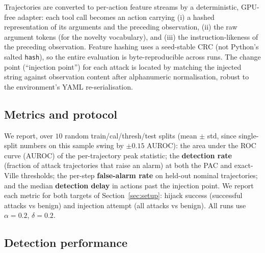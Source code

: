 \documentclass[10pt,journal,compsoc]{IEEEtran}
\theoremstyle{plain}
\theoremstyle{definition}
\begin{document}
Trajectories are converted to per-action feature streams by a deterministic,
GPU-free adapter: each tool call becomes an action carrying (i) a hashed
representation of its arguments and the preceding observation, (ii) the raw
argument tokens (for the novelty vocabulary), and (iii) the
instruction-likeness of the preceding observation. Feature hashing uses a
seed-stable CRC (not Python's salted \texttt{hash}), so the entire evaluation
is byte-reproducible across runs. The change point (``injection point'') for
each attack is located by matching the injected string against observation
content after alphanumeric normalisation, robust to the environment's YAML
re-serialisation.

\subsection{Metrics and protocol}

We report, over \(10\) random train/cal/thresh/test splits (mean \(\pm\)
std, since single-split numbers on this sample swing by \(\pm 0.15\) AUROC):
the area under the ROC curve (AUROC) of the per-trajectory peak statistic;
the \textbf{detection rate} (fraction of attack trajectories that raise an
alarm) at both the PAC and exact-Ville thresholds; the per-step
\textbf{false-alarm rate} on held-out nominal trajectories; and the median
\textbf{detection delay} in actions past the injection point. We report each
metric for both targets of Section~\ref{sec:setup}: hijack success
(successful attacks vs benign) and injection attempt (all attacks vs benign).
All runs use \(\alpha=0.2\), \(\delta=0.2\).

\subsection{Detection performance}\label{sec:detection}\label{sec:results}
\end{document}
